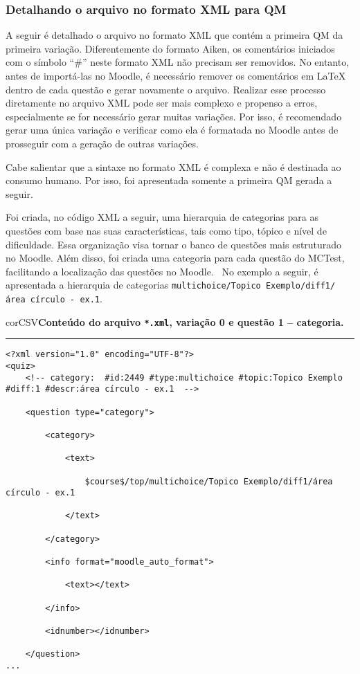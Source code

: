 \subsubsection{Detalhando o arquivo no formato XML para QM}

A seguir é detalhado o arquivo no formato XML que contém a primeira QM da primeira variação. Diferentemente do formato Aiken, os comentários iniciados com o símbolo ``\#'' neste formato XML não precisam ser removidos. No entanto, antes de importá-las no Moodle, é necessário remover os comentários em \LaTeX{} dentro de cada questão e gerar novamente o arquivo. Realizar esse processo diretamente no arquivo XML pode ser mais complexo e propenso a erros, especialmente se for necessário gerar muitas variações. Por isso, é recomendado gerar uma única variação e verificar como ela é formatada no Moodle antes de prosseguir com a geração de outras variações.

Cabe salientar que a sintaxe no formato XML é complexa e não é destinada ao consumo humano. Por isso, foi apresentada somente a primeira QM gerada a seguir.

Foi criada, no código XML a seguir, uma hierarquia de categorias para as questões com base nas suas características, tais como tipo, tópico e nível de dificuldade. Essa organização visa tornar o banco de questões mais estruturado no Moodle. Além disso, foi criada uma categoria para cada questão do MCTest, facilitando a localização das questões no Moodle.
\
No exemplo a seguir, é apresentada a hierarquia de categorias  \verb|multichoice/Topico Exemplo/diff1/área círculo - ex.1|.



\begin{myboxCode}{corCSV}{\textbf{Conteúdo do arquivo \texttt{*.xml}, variação 0 e questão 1 -- categoria.}}\vspace{3mm}
\hrule
{\scriptsize
\begin{verbatim}
<?xml version="1.0" encoding="UTF-8"?>
<quiz>
    <!-- category:  #id:2449 #type:multichoice #topic:Topico Exemplo #diff:1 #descr:área círculo - ex.1  -->
    
    <question type="category">
    
        <category>
        
            <text>
            
                $course$/top/multichoice/Topico Exemplo/diff1/área círculo - ex.1
            
            </text>
            
        </category>
        
        <info format="moodle_auto_format">
        
            <text></text>
            
        </info>
        
        <idnumber></idnumber>
        
    </question>
...
\end{verbatim}
}
\end{myboxCode}



